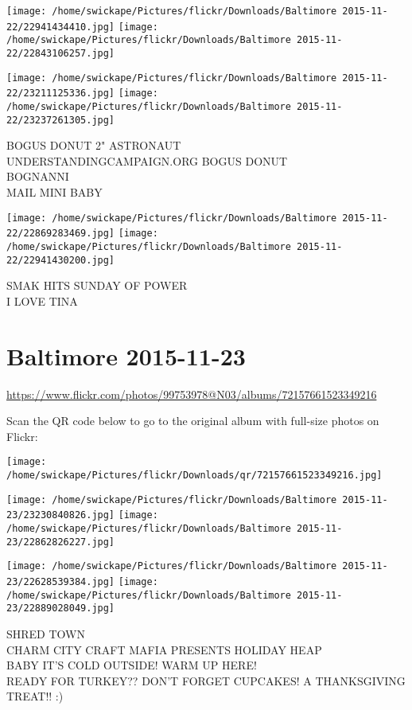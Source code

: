 \documentclass[10pt,letterpaper]{article}
\begin{document}
\texttt{[image: /home/swickape/Pictures/flickr/Downloads/Baltimore 2015-11-22/22941434410.jpg]}
\texttt{[image: /home/swickape/Pictures/flickr/Downloads/Baltimore 2015-11-22/22843106257.jpg]}

\texttt{[image: /home/swickape/Pictures/flickr/Downloads/Baltimore 2015-11-22/23211125336.jpg]}
\texttt{[image: /home/swickape/Pictures/flickr/Downloads/Baltimore 2015-11-22/23237261305.jpg]}

BOGUS DONUT 2" ASTRONAUT\\
UNDERSTANDINGCAMPAIGN.ORG BOGUS DONUT\\
BOGNANNI\\
MAIL MINI BABY
\pagebreak

\texttt{[image: /home/swickape/Pictures/flickr/Downloads/Baltimore 2015-11-22/22869283469.jpg]}
\texttt{[image: /home/swickape/Pictures/flickr/Downloads/Baltimore 2015-11-22/22941430200.jpg]}

SMAK HITS SUNDAY OF POWER\\
I LOVE TINA
\pagebreak

\section*{Baltimore 2015-11-23}

\url{https://www.flickr.com/photos/99753978@N03/albums/72157661523349216}

Scan the QR code below to go to the original album with full-size photos on Flickr:

\texttt{[image: /home/swickape/Pictures/flickr/Downloads/qr/72157661523349216.jpg]}
\pagebreak

\texttt{[image: /home/swickape/Pictures/flickr/Downloads/Baltimore 2015-11-23/23230840826.jpg]}
\texttt{[image: /home/swickape/Pictures/flickr/Downloads/Baltimore 2015-11-23/22862826227.jpg]}

\texttt{[image: /home/swickape/Pictures/flickr/Downloads/Baltimore 2015-11-23/22628539384.jpg]}
\texttt{[image: /home/swickape/Pictures/flickr/Downloads/Baltimore 2015-11-23/22889028049.jpg]}

SHRED TOWN\\
CHARM CITY CRAFT MAFIA PRESENTS HOLIDAY HEAP\\
BABY IT'S COLD OUTSIDE!  WARM UP HERE!\\
READY FOR TURKEY??  DON'T FORGET CUPCAKES!  A THANKSGIVING TREAT!! :)
\pagebreak
\end{document}
